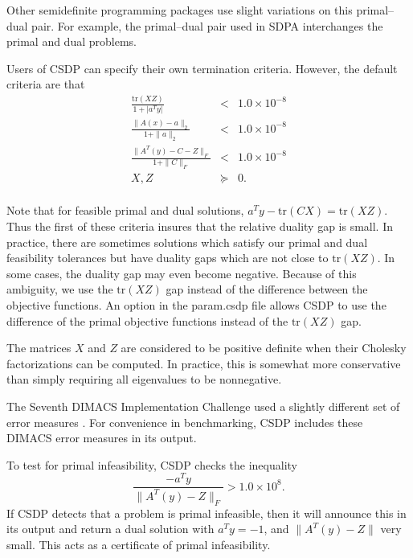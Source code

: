 \documentclass{article}
\begin{document}
Other semidefinite programming packages use slight variations on this
primal--dual pair.  For example, the primal--dual pair used in SDPA 
interchanges the primal and dual problems.

Users of CSDP can specify their own termination criteria.  However, the
default criteria are that 
\begin{equation}
\begin{array}{rcl}
   \frac{\mbox{tr}(XZ)}{1+ | a^{T}y| } &  <  & 1.0 \times 10^{-8} \\ 
   \frac{\| A(x)- a\|_{2}}{1 + \| a \|_{2}} & < &  1.0 \times 10^{-8} \\ 
   \frac{\| A^{T}(y) -C -Z \|_{F}}{1 + \|C\|_{F}} & < & 1.0 \times 10^{-8} \\
   X,Z & \succeq & 0. \\
\end{array}
\end{equation}

Note that for feasible primal and dual solutions,
$a^Ty-\mbox{tr}(CX)=\mbox{tr}(XZ)$.  Thus the first of these criteria insures
that the relative duality gap is small.  In practice, there are
sometimes solutions which satisfy our primal and dual feasibility
tolerances but have duality gaps which are not close to
$\mbox{tr}(XZ)$.  In some cases, the duality gap may even become
negative.  Because of this ambiguity, we use the $\mbox{tr}(XZ)$ gap
instead of the difference between the objective functions.  An option
in the param.csdp file allows CSDP to use the difference of the primal
objective functions instead of the $\mbox{tr}(XZ)$ gap.

The matrices $X$ and $Z$ are considered to be positive definite when
their Cholesky factorizations can be computed.  In practice, this is
somewhat more conservative than simply requiring all eigenvalues to be
nonnegative.

The Seventh DIMACS Implementation Challenge used a slightly different
set of error measures \cite{MittelmannHD:AnibS}.  For convenience in
benchmarking, CSDP includes these DIMACS error measures in its
output.  

To test for primal infeasibility, CSDP checks the inequality
\begin{equation}
\frac{-a^{T}y}{\| A^{T}(y)-Z \|_{F}} > 1.0 \times 10^8.
\end{equation}
If CSDP detects that a problem is primal infeasible, then it will announce
this in its output and return a dual solution with $a^{T}y=-1$, and 
$\| A^{T}(y)-Z \|$ very small.  This acts as a certificate of primal 
infeasibility.  
\end{document}
